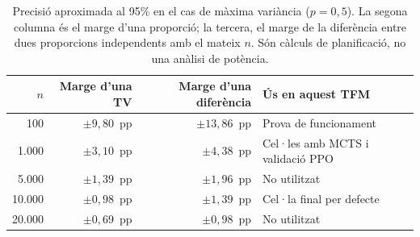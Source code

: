 \begin{table}[htbp]
\centering
\caption{Precisió aproximada al 95\% en el cas de màxima variància ($p=0{,}5$). La segona columna és el marge d'una proporció; la tercera, el marge de la diferència entre dues proporcions independents amb el mateix $n$. Són càlculs de planificació, no una anàlisi de potència.}
\label{tab:ci_n}
\small
\begin{tabular}{rrrl}
\toprule
\textbf{$n$} & \textbf{Marge d'una TV} & \textbf{Marge d'una diferència} & \textbf{Ús en aquest TFM} \\
\midrule
100     & $\pm 9{,}80$~pp & $\pm 13{,}86$~pp & Prova de funcionament \\
1.000   & $\pm 3{,}10$~pp & $\pm 4{,}38$~pp & Cel·les amb MCTS i validació PPO \\
5.000   & $\pm 1{,}39$~pp & $\pm 1{,}96$~pp & No utilitzat \\
10.000  & $\pm 0{,}98$~pp & $\pm 1{,}39$~pp & Cel·la final per defecte \\
20.000  & $\pm 0{,}69$~pp & $\pm 0{,}98$~pp & No utilitzat \\
\bottomrule
\end{tabular}
\end{table}
